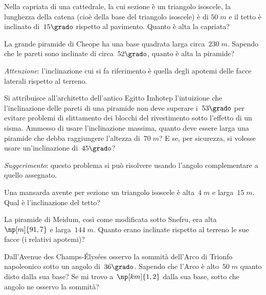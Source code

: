 \begin{multicols}{2}
\begin{esercizio}[\Ast]
\label{ese:C.57}
Nella capriata di una cattedrale, la cui sezione è un triangolo isoscele, la lunghezza della catena (cioè della base del triangolo isoscele) è di
$50\;\unit{m}$ e il tetto è inclinato di~$15\grado$ rispetto al pavimento. Quanto è alta la capriata?
\end{esercizio}

\begin{esercizio}[\Ast]
\label{ese:C.58}
La grande piramide di Cheope ha una base quadrata larga circa~$230\;\unit{m}$. Sapendo che le pareti sono inclinate di circa~$52\grado$,
quanto è alta la piramide?

\emph{Attenzione}: l'inclinazione cui si fa riferimento è quella degli apotemi delle facce laterali rispetto al terreno.
\end{esercizio}

\begin{esercizio}[\Ast]
\label{ese:C.59}
Si attribuisce all'architetto dell'antico Egitto Imhotep l'intuizione che l'inclinazione delle pareti di una piramide non deve superare
i~$53\grado$ per evitare problemi di slittamento dei blocchi del rivestimento sotto l'effetto di un sisma. Ammesso di usare
l'inclinazione massima, quanto deve essere larga una piramide che debba raggiungere l'altezza di~$70\;\unit{m}$?
E se, per sicurezza, si volesse usare un'inclinazione di~$45\grado$?

\emph{Suggerimento}: questo problema si può risolvere usando l'angolo complementare a quello assegnato.
\end{esercizio}

\begin{esercizio}[\Ast]
\label{ese:C.60}
Una mansarda avente per sezione un triangolo isoscele è alta~$4\;\unit{m}$ e larga~$15\;\unit{m}$. Qual è l'inclinazione del tetto?
\end{esercizio}

\begin{esercizio}[\Ast]
\label{ese:C.61}
La piramide di Meidum, così come modificata sotto Snefru, era alta~$\np[m]{91,7}$ e larga~$144\;\unit{m}$.
Quanto erano inclinate rispetto al terreno le sue facce (i relativi apotemi)?
\end{esercizio}

\begin{esercizio}[\Ast]
\label{ese:C.62}
Dall'Avenue des Champs-Élysées osservo la sommità dell'Arco di Trionfo napoleonico sotto un angolo di~$36\grado$.
Sapendo che l'Arco è alto~$50\;\unit{m}$ quanto disto dalla sua base? Se mi trovo a~$\np[km]{1,2}$ dalla sua base,
sotto che angolo ne osservo la sommità?
\end{esercizio}


\end{multicols}

